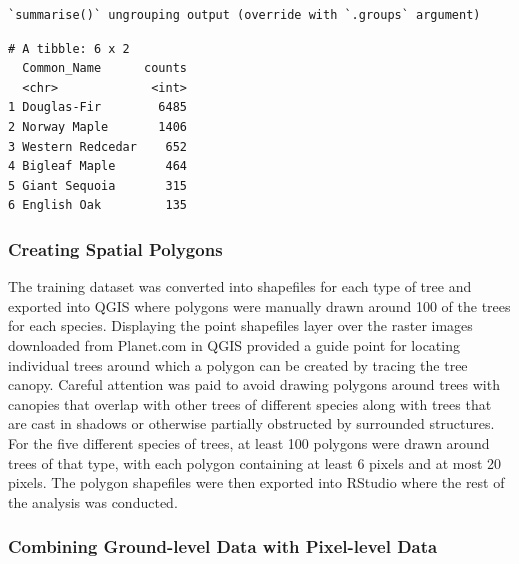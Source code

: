 \documentclass[12pt,twoside]{reedthesis}
\begin{document}
\begin{verbatim}
`summarise()` ungrouping output (override with `.groups` argument)
\end{verbatim}
\begin{verbatim}
# A tibble: 6 x 2
  Common_Name      counts
  <chr>             <int>
1 Douglas-Fir        6485
2 Norway Maple       1406
3 Western Redcedar    652
4 Bigleaf Maple       464
5 Giant Sequoia       315
6 English Oak         135
\end{verbatim}
\hypertarget{creating-spatial-polygons}{%
\subsubsection{Creating Spatial Polygons}\label{creating-spatial-polygons}}

The training dataset was converted into shapefiles for each type of tree and exported into QGIS where polygons were manually drawn around 100 of the trees for each species. Displaying the point shapefiles layer over the raster images downloaded from Planet.com in QGIS provided a guide point for locating individual trees around which a polygon can be created by tracing the tree canopy. Careful attention was paid to avoid drawing polygons around trees with canopies that overlap with other trees of different species along with trees that are cast in shadows or otherwise partially obstructed by surrounded structures. For the five different species of trees, at least 100 polygons were drawn around trees of that type, with each polygon containing at least 6 pixels and at most 20 pixels. The polygon shapefiles were then exported into RStudio where the rest of the analysis was conducted.

\hypertarget{combining-ground-level-data-with-pixel-level-data}{%
\subsubsection{Combining Ground-level Data with Pixel-level Data}\label{combining-ground-level-data-with-pixel-level-data}}
\end{document}
